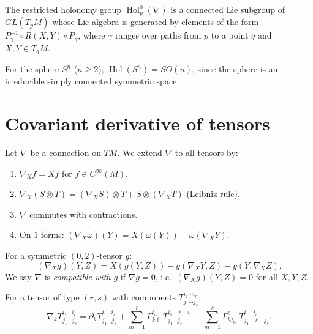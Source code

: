 \begin{theorem}
The restricted holonomy group $\operatorname{Hol}^0_p(\nabla)$ is a connected
Lie subgroup of $GL(T_pM)$ whose Lie algebra is generated by elements of the
form $P_\gamma^{-1} \circ R(X, Y) \circ P_\gamma$, where $\gamma$ ranges over
paths from $p$ to a point $q$ and $X, Y \in T_qM$.
\end{theorem}

\begin{example}[Holonomy of $S^n$]
For the sphere $S^n$ ($n \geq 2$), $\operatorname{Hol}(S^n) = SO(n)$, since the
sphere is an irreducible simply connected symmetric space.
\end{example}

\section{Covariant derivative of tensors}

\begin{definition}
Let $\nabla$ be a connection on $TM$. We extend $\nabla$ to all tensors by:
\begin{enumerate}
    \item $\nabla_X f = Xf$ for $f \in C^\infty(M)$.
    \item $\nabla_X(S \otimes T) = (\nabla_X S) \otimes T + S \otimes (\nabla_X T)$
          (Leibniz rule).
    \item $\nabla$ commutes with contractions.
    \item On $1$-forms: $(\nabla_X \omega)(Y) = X(\omega(Y)) - \omega(\nabla_X Y)$.
\end{enumerate}
\end{definition}

\begin{proposition}
For a symmetric $(0,2)$-tensor $g$:
\[
    (\nabla_X g)(Y, Z) = X(g(Y,Z)) - g(\nabla_X Y, Z) - g(Y, \nabla_X Z).
\]
We say $\nabla$ is \emph{compatible with $g$} if $\nabla g = 0$, i.e.\
$(\nabla_X g)(Y,Z) = 0$ for all $X, Y, Z$.
\end{proposition}

\begin{keyformulas}[title=\textbf{Covariant derivative in coordinates}]
For a tensor of type $(r, s)$ with components $T^{i_1 \cdots i_r}_{j_1 \cdots j_s}$:
\[
    \nabla_k T^{i_1 \cdots i_r}_{j_1 \cdots j_s}
    = \partial_k T^{i_1 \cdots i_r}_{j_1 \cdots j_s}
    + \sum_{m=1}^r \Gamma^{i_m}_{k\ell}\, T^{i_1 \cdots \ell \cdots i_r}_{j_1 \cdots j_s}
    - \sum_{m=1}^s \Gamma^\ell_{k j_m}\, T^{i_1 \cdots i_r}_{j_1 \cdots \ell \cdots j_s}.
\]
\end{keyformulas}


